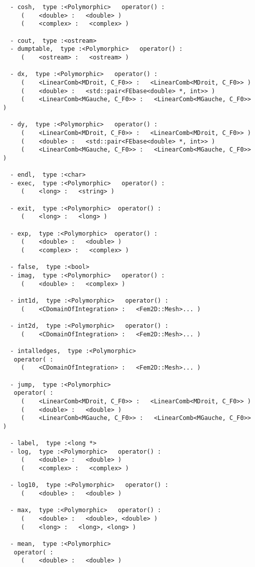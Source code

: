 \documentclass[twoside]{book}
\begin{document}
\begin{verbatim}
  - cosh,  type :<Polymorphic>   operator() : 
	 (	  <double> :   <double> )
	 (	  <complex> :   <complex> )

  - cout,  type :<ostream>
  - dumptable,  type :<Polymorphic>   operator() : 
	 (	  <ostream> :   <ostream> )

  - dx,  type :<Polymorphic>   operator() : 
	 (	  <LinearComb<MDroit, C_F0>> :   <LinearComb<MDroit, C_F0>> )
	 (	  <double> :   <std::pair<FEbase<double> *, int>> )
	 (	  <LinearComb<MGauche, C_F0>> :   <LinearComb<MGauche, C_F0>> )

  - dy,  type :<Polymorphic>   operator() : 
	 (	  <LinearComb<MDroit, C_F0>> :   <LinearComb<MDroit, C_F0>> )
	 (	  <double> :   <std::pair<FEbase<double> *, int>> )
	 (	  <LinearComb<MGauche, C_F0>> :   <LinearComb<MGauche, C_F0>> )

  - endl,  type :<char>
  - exec,  type :<Polymorphic>   operator() : 
	 (	  <long> :   <string> )

  - exit,  type :<Polymorphic>  operator() : 
	 (	  <long> :   <long> )

  - exp,  type :<Polymorphic>  operator() : 
	 (	  <double> :   <double> )
	 (	  <complex> :   <complex> )

  - false,  type :<bool>
  - imag,  type :<Polymorphic>   operator() : 
	 (	  <double> :   <complex> )

  - int1d,  type :<Polymorphic>   operator() : 
	 (	  <CDomainOfIntegration> :   <Fem2D::Mesh>... )

  - int2d,  type :<Polymorphic>   operator() : 
	 (	  <CDomainOfIntegration> :   <Fem2D::Mesh>... )

  - intalledges,  type :<Polymorphic>
   operator( : 
	 (	  <CDomainOfIntegration> :   <Fem2D::Mesh>... )

  - jump,  type :<Polymorphic>
   operator( : 
	 (	  <LinearComb<MDroit, C_F0>> :   <LinearComb<MDroit, C_F0>> )
	 (	  <double> :   <double> )
	 (	  <LinearComb<MGauche, C_F0>> :   <LinearComb<MGauche, C_F0>> )

  - label,  type :<long *>
  - log,  type :<Polymorphic>   operator() : 
	 (	  <double> :   <double> )
	 (	  <complex> :   <complex> )

  - log10,  type :<Polymorphic>   operator() : 
	 (	  <double> :   <double> )

  - max,  type :<Polymorphic>   operator() : 
	 (	  <double> :   <double>, <double> )
	 (	  <long> :   <long>, <long> )

  - mean,  type :<Polymorphic>
   operator( : 
	 (	  <double> :   <double> )


\end{verbatim}
\end{document}
